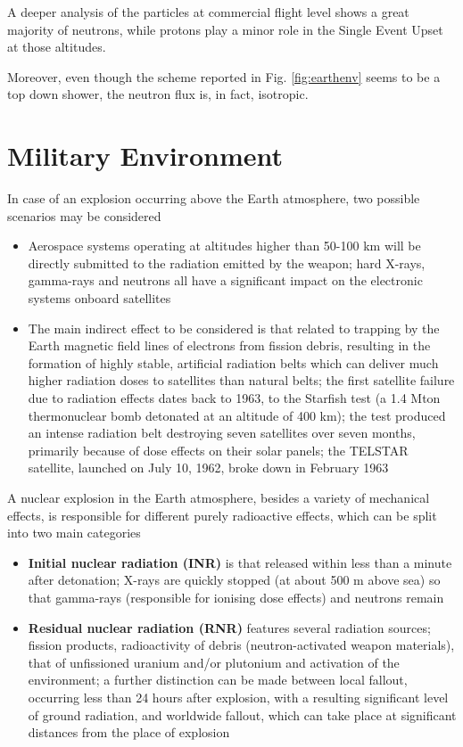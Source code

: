 \documentclass[./dissertation.tex]{subfiles}
\begin{document}
A deeper analysis of the particles at commercial flight level shows a great majority of neutrons, while protons play a minor role in the Single Event Upset at those altitudes.

Moreover, even though the scheme reported in Fig. \ref{fig:earthenv} seems to be a top down shower, the neutron flux is, in fact, isotropic.


\section{Military Environment}
In case of an explosion occurring above the Earth atmosphere, two possible scenarios may be considered
\begin{itemize}
    \item Aerospace  systems  operating  at  altitudes  higher  than  50-100  km  will  be directly  submitted  to  the radiation  emitted  by  the  weapon;  hard  X-rays,  gamma-rays  and  neutrons  all  have  a  significant  impact on the electronic systems onboard satellites
    \item The main indirect effect to be considered is that related to trapping by the Earth magnetic field lines of electrons from fission debris, resulting in the formation of highly stable, artificial radiation belts which  can  deliver  much  higher  radiation  doses  to  satellites  than  natural  belts;  the  first  satellite failure  due  to  radiation  effects  dates  back  to  1963,  to  the  Starfish  test  (a  1.4  Mton  thermonuclear bomb  detonated  at  an  altitude  of  400  km);  the  test  produced  an  intense  radiation  belt  destroying  seven  satellites  over  seven  months,  primarily  because  of  dose  effects  on  their  solar  panels;  the TELSTAR satellite, launched on July 10, 1962, broke down in February 1963
\end{itemize}

A nuclear explosion in the Earth atmosphere, besides a variety of mechanical effects, is responsible for different purely radioactive effects, which can be split into two main categories 
\begin{itemize}
    \item \textbf{Initial nuclear radiation (INR)} is that released within less than a minute after detonation; X-rays are quickly stopped (at about 500 m above sea) so that gamma-rays (responsible for ionising dose effects) and neutrons remain 
    \item \textbf{Residual nuclear radiation (RNR)} features several radiation sources; fission products, radioactivity of debris  (neutron-activated  weapon  materials),  that  of  unfissioned  uranium  and/or  plutonium  and activation of the environment; a further distinction can be made between local fallout, occurring less than  24  hours  after  explosion,  with  a  resulting  significant  level  of  ground  radiation,  and  worldwide fallout, which can take place at significant distances from the place of explosion 
\end{itemize}
\end{document}
